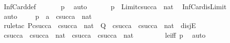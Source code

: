 \begin{isabellebody}
\ InfCard{\isacharunderscore}{\kern0pt}def\ \isanewline
\ \ \ \ \isamarkupfalse%
\ p{}\ \isamarkupfalse%
\ auto\ \isanewline
\ \ \isamarkupfalse%
\ \isamarkupfalse%
\ p{}{}\ {\isacharcolon}{\kern0pt}\ {\isachardoublequoteopen}Limit{\isacharparenleft}{\kern0pt}csucc{\isacharparenleft}{\kern0pt}a{\isacharparenright}{\kern0pt}\ {\isasymoplus}\ nat{\isacharparenright}{\kern0pt}{\isachardoublequoteclose}\ \isamarkupfalse%
\ InfCard{\isacharunderscore}{\kern0pt}is{\isacharunderscore}{\kern0pt}Limit\ \isamarkupfalse%
\ auto\ \isanewline
\ \ \isamarkupfalse%
\ p{}{}\ {\isacharcolon}{\kern0pt}\ {\isachardoublequoteopen}a\ {\isacharless}{\kern0pt}\ csucc{\isacharparenleft}{\kern0pt}a{\isacharparenright}{\kern0pt}\ {\isasymoplus}\ nat{\isachardoublequoteclose}\ \isanewline
\ \ \ \ \isamarkupfalse%
\ {\isacharparenleft}{\kern0pt}rule{\isacharunderscore}{\kern0pt}tac\ P{\isacharequal}{\kern0pt}{\isachardoublequoteopen}csucc{\isacharparenleft}{\kern0pt}a{\isacharparenright}{\kern0pt}\ {\isacharless}{\kern0pt}\ {\isacharparenleft}{\kern0pt}csucc{\isacharparenleft}{\kern0pt}a{\isacharparenright}{\kern0pt}\ {\isasymoplus}\ nat{\isacharparenright}{\kern0pt}{\isachardoublequoteclose}\ \ Q\ {\isacharequal}{\kern0pt}\ {\isachardoublequoteopen}csucc{\isacharparenleft}{\kern0pt}a{\isacharparenright}{\kern0pt}\ {\isacharequal}{\kern0pt}\ {\isacharparenleft}{\kern0pt}csucc{\isacharparenleft}{\kern0pt}a{\isacharparenright}{\kern0pt}\ {\isasymoplus}\ nat{\isacharparenright}{\kern0pt}{\isachardoublequoteclose}\ \ disjE{\isacharparenright}{\kern0pt}\ \isanewline
\ \ \isamarkupfalse%
\ {\isacharminus}{\kern0pt}\ \isanewline
\ \ \ \ \isamarkupfalse%
\ {\isachardoublequoteopen}csucc{\isacharparenleft}{\kern0pt}a{\isacharparenright}{\kern0pt}\ {\isacharless}{\kern0pt}\ csucc{\isacharparenleft}{\kern0pt}a{\isacharparenright}{\kern0pt}\ {\isasymoplus}\ nat\ {\isasymor}\ csucc{\isacharparenleft}{\kern0pt}a{\isacharparenright}{\kern0pt}\ {\isacharequal}{\kern0pt}\ csucc{\isacharparenleft}{\kern0pt}a{\isacharparenright}{\kern0pt}\ {\isasymoplus}\ nat{\isachardoublequoteclose}\ \isanewline
\ \ \ \ \ \ \isamarkupfalse%
\ le{\isacharunderscore}{\kern0pt}iff\ p{}\ \isamarkupfalse%
\ auto\ \isanewline
\ \ \isamarkupfalse%
\ \isanewline
\ \ \ \ \isamarkupfalse%

\end{isabellebody}
